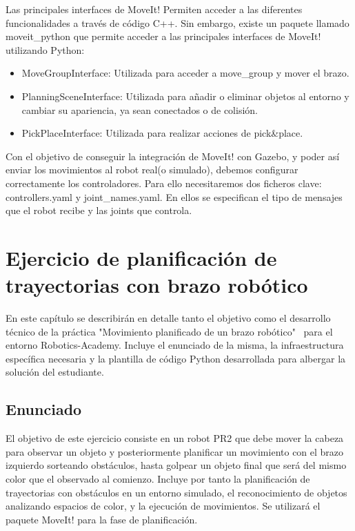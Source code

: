 \documentclass[12pt,spanish,chapterprefix, numbers=noenddot]{book}
\numberwithin{equation}{section}
\numberwithin{figure}{section}
\begin{document}
Las principales interfaces de MoveIt! Permiten acceder a las diferentes funcionalidades a través de código C++. Sin embargo, existe un paquete llamado moveit\_python que permite acceder a las principales interfaces de MoveIt! utilizando Python:
\begin{itemize}
\item MoveGroupInterface: Utilizada para acceder a move\_group y mover el brazo. 
\item PlanningSceneInterface: Utilizada para añadir o eliminar objetos al entorno y cambiar su apariencia, ya sean conectados o de colisión. 
\item PickPlaceInterface: Utilizada para realizar acciones de pick\&place.
\end{itemize}

Con el objetivo de conseguir la integración de MoveIt! con Gazebo, y poder así enviar los movimientos al robot real(o simulado), debemos configurar correctamente los controladores. Para ello necesitaremos dos ficheros clave: controllers.yaml y joint\_names.yaml.  En ellos se especifican el tipo de mensajes que el robot recibe y las joints que controla.  

\chapter{Ejercicio de planificación de trayectorias con brazo robótico}
En este capítulo se describirán en detalle tanto el objetivo como el desarrollo técnico de la práctica "Movimiento planificado de un brazo robótico" \ para el entorno Robotics-Academy. 
Incluye el enunciado de la misma, la infraestructura específica necesaria y la plantilla de código Python desarrollada para albergar la solución del estudiante. 

\section{Enunciado}
 El objetivo de este ejercicio consiste en un robot PR2 que debe mover la cabeza para observar un objeto y posteriormente planificar un movimiento con el brazo izquierdo sorteando obstáculos, hasta golpear un objeto final que será del mismo color que el observado al comienzo. Incluye por tanto la planificación de trayectorias con obstáculos en un entorno simulado, el reconocimiento de objetos analizando espacios de color, y la ejecución de movimientos. Se utilizará el paquete MoveIt! para la fase de planificación. 
\end{document}
